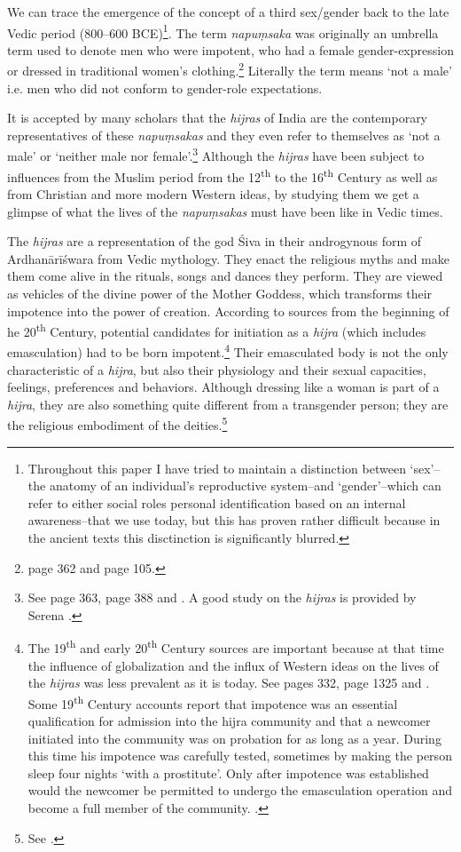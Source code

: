 We can trace the emergence of the concept of a third sex/gender back to the late Vedic period (800–600 BCE)\footnote{Throughout this paper I have tried to maintain a distinction between `sex'--the anatomy of an individual's reproductive system--and `gender'--which can refer to either social roles personal identification based on an internal awareness--that we use today, but this has proven rather difficult because in the ancient texts this disctinction is significantly blurred.}. The term {\em napuṃsaka} was originally an umbrella term used to denote men who were impotent, who had a female gender-expression or dressed in traditional women's clothing.\footnote{\cite{zwilling} page 362 and \cite{zwilling2000} page 105.} Literally the term means `not a male' i.e. men who did not conform to gender-role expectations.

It is accepted by many scholars that the {\em hijras} of India are the contemporary representatives of these {\em napuṃsakas} and they even refer to themselves as `not a male' or `neither male nor female'.\footnote{See \cite{zwilling} page 363, \cite{goldman} page 388 and \cite{wendy}. A good study on the {\em hijras} is provided by Serena \cite{nanda}.} Although the {\em hijras} have been subject to influences from the Muslim period from the 12\textsuperscript{th} to the 16\textsuperscript{th} Century as well as from Christian and more modern Western ideas, by studying them we get a glimpse of what the lives of the {\em napuṃsakas} must have been like in Vedic times. 

The {\em hijras} are a representation of the god Śiva in their androgynous form of Ardhanārīśwara from Vedic mythology. They enact the religious myths and make them come alive in the rituals, songs and dances they perform. They are viewed as vehicles of the divine power of the Mother Goddess, which transforms their impotence into the power of creation. According to sources from the beginning of he 20\textsuperscript{th} Century, potential candidates for initiation as a {\em hijra} (which includes emasculation) had to be born impotent.\footnote{The 19\textsuperscript{th} and early 20\textsuperscript{th} Century sources are important because at that time the influence of globalization and the influx of Western ideas on the lives of the {\em hijras} was less prevalent as it is today. See \cite{ibbetson} pages 332, \cite{shah} page 1325 and \cite{bhimbhai}. Some 19\textsuperscript{th} Century accounts report that impotence was an essential qualification for admission into the hijra community and that a newcomer initiated into the community was on probation for as long as a year. During this time his impotence was carefully tested, sometimes by making the person sleep four nights `with a prostitute'. Only after impotence was established would the newcomer be permitted to undergo the emasculation operation and become a full member of the community. \cite{preston}.} Their emasculated body is not the only characteristic of a {\em hijra}, but also their physiology and their sexual capacities, feelings, preferences and behaviors. Although dressing like a woman is part of a {\em hijra}, they are also something quite different from a transgender person; they are the religious embodiment of the deities.\footnote{See \cite{nanda}.}

